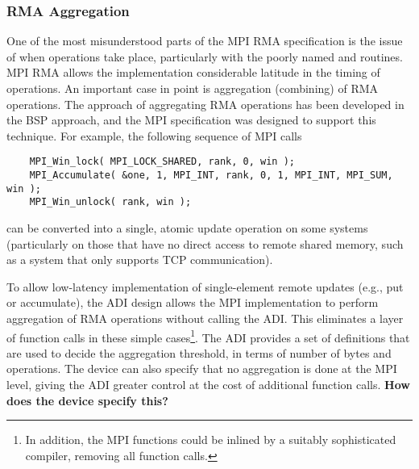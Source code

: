 {\subsubsection{RMA Aggregation}
One of the most misunderstood parts of the MPI RMA specification is
the issue of when operations take place, particularly with the poorly
named  and  routines.  MPI RMA
allows the implementation considerable latitude in the timing of
operations.  An important case in point is aggregation (combining) of RMA
operations.  The approach of aggregating RMA operations has been
developed in the BSP approach, and the MPI specification was designed
to support this technique.  For example, the following sequence of MPI
calls

\begin{small}
\begin{verbatim}
    MPI_Win_lock( MPI_LOCK_SHARED, rank, 0, win );
    MPI_Accumulate( &one, 1, MPI_INT, rank, 0, 1, MPI_INT, MPI_SUM, win );
    MPI_Win_unlock( rank, win );
\end{verbatim}
\end{small}

\noindent
can be converted into a single, atomic update operation on some
systems (particularly on those that have no direct access to remote
shared memory, such as a system that only supports TCP communication).

To allow low-latency implementation of single-element remote updates
(e.g., put or accumulate), the ADI design allows the MPI
implementation to perform aggregation of RMA operations without
calling the ADI.  This eliminates a layer of function calls in these
simple cases\footnote{In addition, the MPI functions could be inlined by a
  suitably sophisticated compiler,
removing all function calls.}.  
The ADI provides a set of definitions
that are used to decide the aggregation threshold, in terms of number
of bytes and operations.  The device can also specify that no
aggregation is done at the MPI level, giving the ADI greater control
at the cost of additional function calls.
\textbf{How does the device specify this?}
%
%

}
